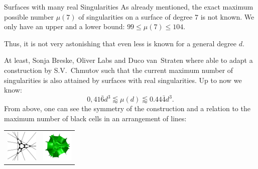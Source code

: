 \begin{surferPage}{Surfaces with many real Singularities}
    As already mentioned, the exact maximum possible number
    $\mu(7)$ of singularities on a surface of degree $7$ is not known.
    We only have an upper and a lower bound: $99\le \mu(7) \le 104$. 


    Thus, it is not very astonishing that even less is known for a general degree $d$. 

    At least, Sonja Breske, Oliver Labs and Duco van~Straten where able to adapt a
    construction by S.V.\ Chmutov such that the current maximum
    number of singularities is also attained by surfaces with real
    singularities. 
    Up to now we know:
    \[0,41\bar{6}d^3 \lessapprox \mu(d) \lessapprox 0.44\bar{4} d^3.\]
     From above, one can see the symmetry of the construction and a relation to
    the maximum number of black cells in an arrangement of lines:
    \begin{center}
      \begin{tabular}{c@{\qquad}c}
        \includegraphics[height=1.5cm]{./../../common/images/vielesing.pdf}
        &
        \includegraphics[height=1.5cm]{./../../common/images/p9surface_von_oben}
      \end{tabular}
    \end{center}
\end{surferPage}
